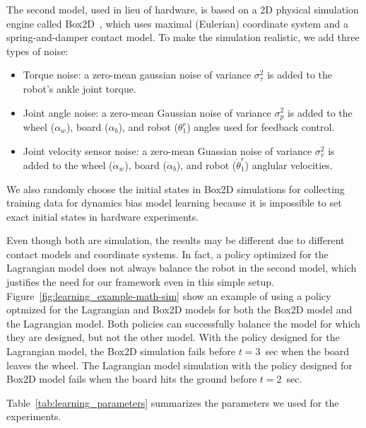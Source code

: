 \documentclass[letterpaper, 10 pt, conference]{ieeeconf}
\begin{document}
The second model, used in lieu of hardware, is based on a 2D physical
simulation engine called 
Box2D~\cite{bib-box2d}, which uses maximal (Eulerian) coordinate system and
a spring-and-damper contact model. %
To make the simulation realistic, we add three types of noise:
\begin{itemize}
\item Torque noise: a zero-mean gaussian noise of variance
	  $\sigma_{\tau}^2$ is added to the robot's ankle joint torque.
\item Joint angle noise: a zero-mean Gaussian noise of variance
	  $\sigma_{p}^2$ is added to the wheel ($\alpha_w$), board
	  ($\alpha_b$), and robot ($\theta_1^r$) angles used for feedback
	  control. 
\item Joint velocity sensor noise: a zero-mean Guassian noise of
	  variance $\sigma_v^2$ is added to the wheel ($\dot{\alpha}_w$),
	  board ($\dot{\alpha}_b$), and robot ($\dot{\theta}_1^r$)
	  anglular velocities.
\end{itemize}
We also randomly choose the initial states in Box2D simulations for
collecting training data for dynamics bias model learning because it is
impossible to set exact initial states in hardware experiments.

Even though both are simulation, the results may be different due to
different contact models and coordinate systems.
In fact, a policy optimized for the Lagrangian model does not always balance
the robot in the second model, which justifies the need for our
framework even in this simple setup.
Figure~\ref{fig:learning_example-math-sim} show an example of using a policy
optmized for the Lagrangian and Box2D models for both the Box2D model
and the Lagrangian model.
Both policies can successfully balance the model for which they are
designed, but not the other model.
With the policy designed for the Lagrangian model, the Box2D simulation
fails before $t=3$~sec when the board leaves the wheel.
The Lagrangian model simulation with the policy designed for Box2D model
fails when the board hits the ground before $t=2$~sec.

Table~\ref{tab:learning_parameters} summarizes the parameters we used for the
experiments.
\end{document}
